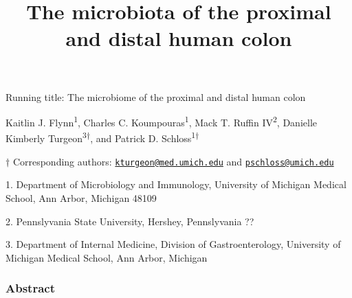 \documentclass[11pt,]{article}
\title{The microbiota of the proximal and distal human colon}
\author{}
\date{}
\begin{document}
\maketitle

\vspace{35mm}

Running title: The microbiome of the proximal and distal human colon

\vspace{35mm}

Kaitlin J. Flynn\textsuperscript{1}, Charles C.
Koumpouras\textsuperscript{1}, Mack T. Ruffin IV\textsuperscript{2},
Danielle Kimberly Turgeon\textsuperscript{3\(\dagger\)}, and Patrick D.
Schloss\textsuperscript{1\(\dagger\)}

\vspace{35mm}

\(\dagger\) Corresponding authors:
\href{mailto:kturgeon@med.umich.edu}{\nolinkurl{kturgeon@med.umich.edu}}
and \href{mailto:pschloss@umich.edu}{\nolinkurl{pschloss@umich.edu}}

1. Department of Microbiology and Immunology, University of Michigan
Medical School, Ann Arbor, Michigan 48109

2. Pennslyvania State University, Hershey, Pennslyvania ??

3. Department of Internal Medicine, Division of Gastroenterology,
University of Michigan Medical School, Ann Arbor, Michigan

\newpage

\subsubsection{Abstract}\label{abstract}
\end{document}
